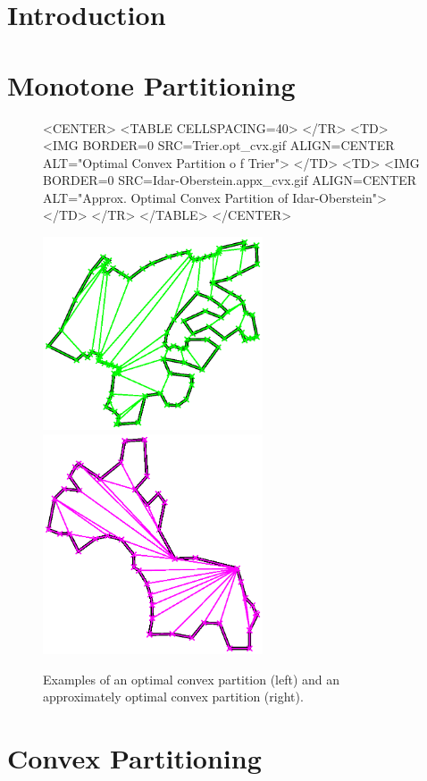 



\section{Introduction}
\label{sec:partition_2_intro}


\section{Monotone Partitioning}
\label{sec:partition_2_monotone}


\begin{figure}
\begin{ccHtmlOnly}
<CENTER>
<TABLE CELLSPACING=40>
</TR>
<TD>
<IMG BORDER=0 SRC=Trier.opt_cvx.gif ALIGN=CENTER ALT="Optimal Convex Partition o
f Trier">
</TD>
<TD>
<IMG BORDER=0 SRC=Idar-Oberstein.appx_cvx.gif ALIGN=CENTER ALT="Approx. Optimal
Convex Partition of Idar-Oberstein">
</TD>
</TR>
</TABLE>
</CENTER>
\end{ccHtmlOnly}

\begin{ccTexOnly}
\begin{center}
\includegraphics[width=6.5cm]{Trier.opt_cvx.ps}
\includegraphics[width=6.5cm]{Idar-Oberstein.appx_cvx.ps}
\end{center}
\end{ccTexOnly}
\caption{Examples of an optimal convex partition (left) and an approximately
optimal convex partition (right).}
\end{figure}


\section{Convex Partitioning}
\label{sec:partition_2_convex}


